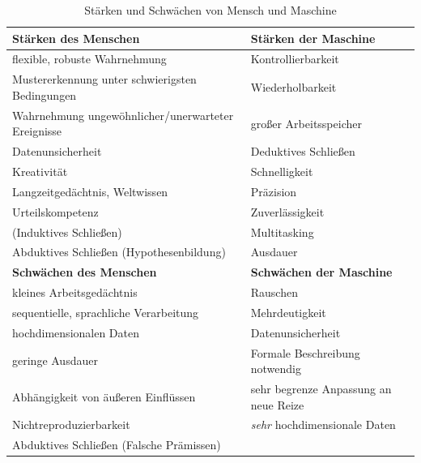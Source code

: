 			\begin{table}
				\centering
				\begin{tabular}{l|l}
					\toprule
					\textbf{Stärken des Menschen}                      & \textbf{Stärken der Maschine}         \\ \midrule
					flexible, robuste Wahrnehmung                      & Kontrollierbarkeit                    \\
					Mustererkennung unter schwierigsten Bedingungen    & Wiederholbarkeit                      \\
					Wahrnehmung ungewöhnlicher/unerwarteter Ereignisse & großer Arbeitsspeicher                \\
					Datenunsicherheit                                  & Deduktives Schließen                  \\
					Kreativität                                        & Schnelligkeit                         \\
					Langzeitgedächtnis, Weltwissen                     & Präzision                             \\
					Urteilskompetenz                                   & Zuverlässigkeit                       \\
					(Induktives Schließen)                             & Multitasking                          \\
					Abduktives Schließen (Hypothesenbildung)           & Ausdauer                              \\ \midrule
					\textbf{Schwächen des Menschen}                    & \textbf{Schwächen der Maschine}       \\ \midrule
					kleines Arbeitsgedächtnis                          & Rauschen                              \\
					sequentielle, sprachliche Verarbeitung             & Mehrdeutigkeit                        \\
					hochdimensionalen Daten                            & Datenunsicherheit                     \\
					geringe Ausdauer                                   & Formale Beschreibung notwendig        \\
					Abhängigkeit von äußeren Einflüssen                & sehr begrenze Anpassung an neue Reize \\
					Nichtreproduzierbarkeit                            & \emph{sehr} hochdimensionale Daten    \\
					Abduktives Schließen (Falsche Prämissen)           &
				\end{tabular}
				\caption{Stärken und Schwächen von Mensch und Maschine}
				\label{tab:staerken}
			\end{table}

